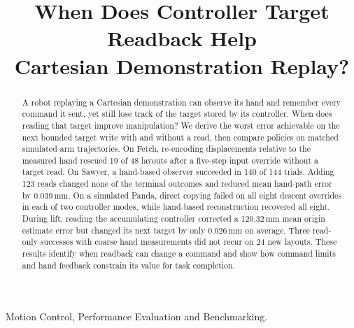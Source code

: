 \documentclass[letterpaper, 10 pt, conference]{ieeeconf}
\title{\LARGE\bf When Does Controller Target Readback Help\\ Cartesian Demonstration Replay?}
\author{\phantom{Anonymous Author}}
\begin{document}
\maketitle
\thispagestyle{empty}
\pagestyle{empty}
\begin{abstract}
A robot replaying a Cartesian demonstration can observe its hand and remember every command it sent, yet still lose track of the target stored by its controller. When does reading that target improve manipulation? We derive the worst error achievable on the next bounded target write with and without a read, then compare policies on matched simulated arm trajectories. On Fetch, re-encoding displacements relative to the measured hand rescued 19 of 48 layouts after a five-step input override without a target read. On Sawyer, a hand-based observer succeeded in 140 of 144 trials. Adding 123 reads changed none of the terminal outcomes and reduced mean hand-path error by 0.039\,mm. On a simulated Panda, direct copying failed on all eight descent overrides in each of two controller modes, while hand-based reconstruction recovered all eight. During lift, reading the accumulating controller corrected a 120.32\,mm mean origin estimate error but changed its next target by only 0.026\,mm on average. Three read-only successes with coarse hand measurements did not recur on 24 new layouts. These results identify when readback can change a command and show how command limits and hand feedback constrain its value for task completion.
\end{abstract}
\begin{keywords}Motion Control, Performance Evaluation and Benchmarking.\end{keywords}
\end{document}
